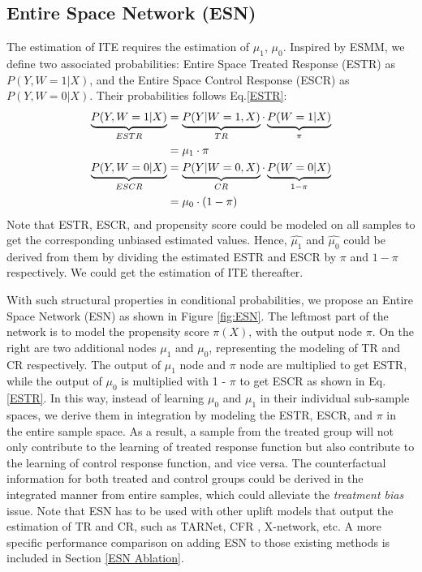 \documentclass[sigconf]{acmart}
\begin{document}
\subsection{Entire Space Network (ESN)}
\label{Method ESN}
The estimation of ITE requires the estimation of $\mu_1$, $\mu_0$. Inspired by ESMM\cite{Ma2018EntireSM}, we define two associated probabilities: Entire Space Treated Response (ESTR) as $P(Y,W=1|X)$, and the Entire Space Control Response (ESCR) as $P(Y,W=0|X)$. Their probabilities follows Eq.\eqref{ESTR}:
\begin{align}
\label{ESTR}
\begin{aligned}
\underbrace{P(Y, W=1|X)}_{ESTR} &= \underbrace{P(Y|W=1,X)}_{TR} \cdot \underbrace{P(W=1|X)}_{\pi} \\ &= \mu_1 \cdot \pi \\
\vspace{0.5cm}
\underbrace{P(Y, W=0|X)}_{ESCR} &= \underbrace{P(Y|W=0,X)}_{CR} \cdot \underbrace{P(W=0|X)}_{1-\pi} \\ &= \mu_0 \cdot (1-\pi)
\end{aligned}
\end{align}
Note that ESTR, ESCR, and propensity score could be modeled on all samples to get the corresponding unbiased estimated values. Hence, $\hat{\mu_1}$ and $\hat{\mu_0}$ could be derived from them by dividing the estimated ESTR and ESCR by $\pi$ and $1-\pi$ respectively. We could get the estimation of ITE thereafter.

With such structural properties in conditional probabilities, we propose an Entire Space Network (ESN) as shown in Figure \ref{fig:ESN}. The leftmost part of the network is to model the propensity score $\pi(X)$, with the output node $\pi$. On the right are two additional nodes $\mu_1$ and $\mu_0$, representing the modeling of TR and CR respectively. The output of $\mu_1$ node and $\pi$ node are multiplied to get ESTR, while the output of $\mu_0$ is multiplied with 1 - $\pi$ to get ESCR as shown in Eq.\ref{ESTR}. In this way, instead of learning $\mu_0$ and $\mu_1$ in their individual sub-sample spaces, we derive them in integration by modeling the ESTR, ESCR, and $\pi$ in the entire sample space. As a result, a sample from the treated group will not only contribute to the learning of treated response function but also contribute to the learning of control response function, and vice versa. The counterfactual information for both treated and control groups could be derived in the integrated manner from entire samples, which could alleviate the \textit{treatment bias} issue. Note that ESN has to be used with other uplift models that output the estimation of TR and CR, such as TARNet, CFR \cite{Shalit2017}, X-network, etc. A more specific performance comparison on adding ESN to those existing methods is included in Section \ref{ESN Ablation}.
\end{document}
